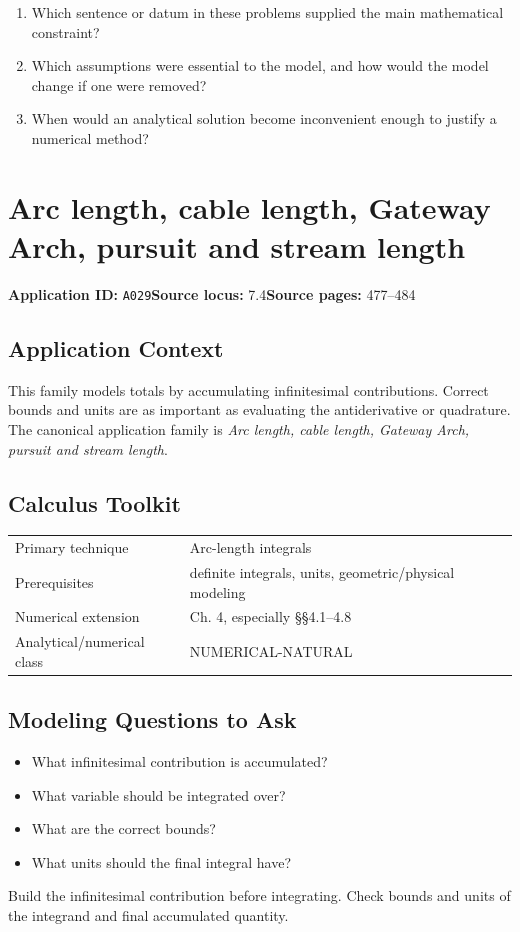 \documentclass[11pt]{book}
\newcommand{\pid}[1]{\texttt{#1}}
\begin{document}
\begin{reflectionbox}\begin{enumerate}
\item Which sentence or datum in these problems supplied the main mathematical constraint?
\item Which assumptions were essential to the model, and how would the model change if one were removed?
\item When would an analytical solution become inconvenient enough to justify a numerical method?
\end{enumerate}\end{reflectionbox}
\chapter{Arc length, cable length, Gateway Arch, pursuit and stream length}\label{app:A029}
\textbf{Application ID:} \pid{A029}\quad \textbf{Source locus:} 7.4\quad \textbf{Source pages:} 477–484
\section*{Application Context}
This family models totals by accumulating infinitesimal contributions. Correct bounds and units are as important as evaluating the antiderivative or quadrature. The canonical application family is \emph{Arc length, cable length, Gateway Arch, pursuit and stream length}.
\section*{Calculus Toolkit}
\begin{tabularx}{\textwidth}{@{}lX@{}}\toprule
Primary technique & Arc-length integrals \\
Prerequisites & definite integrals, units, geometric/physical modeling \\
Numerical extension & Ch. 4, especially §§4.1–4.8 \\
Analytical/numerical class & NUMERICAL-NATURAL \\
\bottomrule\end{tabularx}
\section*{Modeling Questions to Ask}\begin{itemize}
\item What infinitesimal contribution is accumulated?
\item What variable should be integrated over?
\item What are the correct bounds?
\item What units should the final integral have?
\end{itemize}
\begin{errorbox}Build the infinitesimal contribution before integrating. Check bounds and units of the integrand and final accumulated quantity.\end{errorbox}
\end{document}
